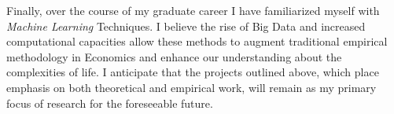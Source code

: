 \documentclass[a4paper,11pt]{article}
\begin{document}
Finally, over the course of my graduate career I have familiarized myself with \textit{Machine Learning} Techniques. I believe the rise of Big Data and increased computational capacities allow these methods to augment traditional empirical methodology in Economics and enhance our understanding about the complexities of life. I anticipate that the projects outlined above, which place emphasis on both theoretical and empirical work, will remain as my primary focus of research for the foreseeable future. 

\end{document}
